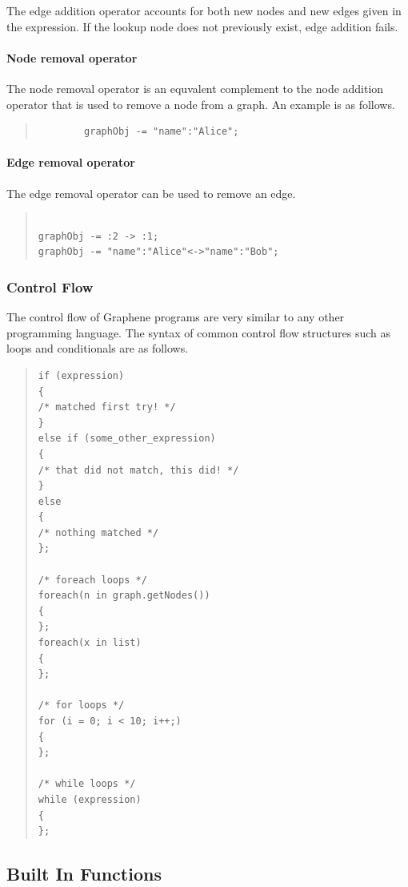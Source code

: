 \documentclass[a4paper]{article}
\begin{document}
\noindent The edge addition operator accounts for both new nodes and new edges given in the expression. If the lookup node does not previously exist, edge addition fails.

\paragraph{Node removal operator}
\noindent The node removal operator is an equvalent complement to the node addition operator that is used to remove a node from a graph. An example is as follows.
\begin{quote}
\begin{verbatim}
		graphObj -= "name":"Alice";
\end{verbatim}
\end{quote}

\paragraph{Edge removal operator}
The edge removal operator can be used to remove an edge.
\begin{quote}
\begin{verbatim}

graphObj -= :2 -> :1; 
graphObj -= "name":"Alice"<->"name":"Bob";

\end{verbatim}
\end{quote}

\subsubsection{Control Flow}
The control flow of Graphene programs are very similar to any other programming language. The syntax of common control flow structures such as loops and conditionals are as follows.
\begin{quote}
\begin{verbatim}
if (expression)
{
/* matched first try! */
}
else if (some_other_expression)
{
/* that did not match, this did! */
}
else
{
/* nothing matched */
};

/* foreach loops */
foreach(n in graph.getNodes())
{
};
foreach(x in list)
{
};

/* for loops */
for (i = 0; i < 10; i++;)
{
};

/* while loops */
while (expression)
{
};
\end{verbatim}
\end{quote}

\subsection{Built In Functions}
\end{document}
